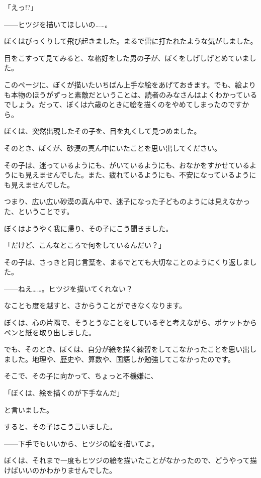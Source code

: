 「えっ!?」

——ヒツジを描いてほしいの……。

ぼくはびっくりして飛び起きました。まるで雷に打たれたような気がしました。

目をこすって見てみると、な格好をした男の子が、ぼくをしげしげとめていました。


このページに、ぼくが描いたいちばん上手な絵をあげておきます。でも、絵よりも本物のほうがずっと素敵だということは、読者のみなさんはよくわかっているでしょう。だって、ぼくは六歳のときに絵を描くのをやめてしまったのですから。

ぼくは、突然出現したその子を、目を丸くして見つめました。

そのとき、ぼくが、砂漠の真ん中にいたことを思い出してください。

その子は、迷っているようにも、がいているようにも、おなかをすかせているようにも見えませんでした。また、疲れているようにも、不安になっているようにも見えませんでした。

つまり、広い広い砂漠の真ん中で、迷子になった子どものようには見えなかった、ということです。

ぼくはようやく我に帰り、その子にこう聞きました。

「だけど、こんなところで何をしているんだい？」

その子は、さっきと同じ言葉を、まるでとても大切なことのようにくり返しました。

——ねえ……。ヒツジを描いてくれない？

なことも度を越すと、さからうことができなくなります。

ぼくは、心の片隅で、そうとうなことをしているぞと考えながら、ポケットからペンと紙を取り出しました。

でも、そのとき、ぼくは、自分が絵を描く練習をしてこなかったことを思い出しました。地理や、歴史や、算数や、国語しか勉強してこなかったのです。

そこで、その子に向かって、ちょっと不機嫌に、

「ぼくは、絵を描くのが下手なんだ」

と言いました。

すると、その子はこう言いました。

——下手でもいいから、ヒツジの絵を描いてよ。

ぼくは、それまで一度もヒツジの絵を描いたことがなかったので、どうやって描けばいいのかわかりませんでした。

